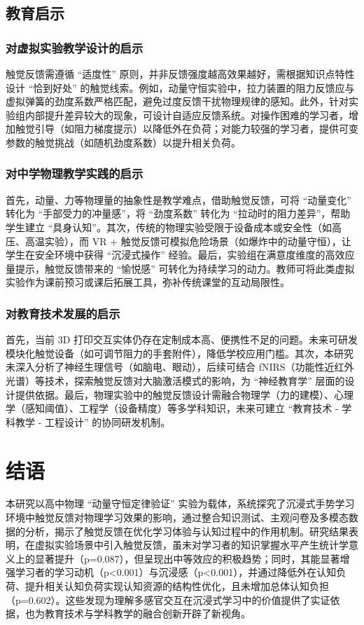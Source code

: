 \documentclass[runningheads]{llncs}
\begin{document}
\subsection{教育启示}
\subsubsection{对虚拟实验教学设计的启示}
触觉反馈需遵循 “适度性” 原则，并非反馈强度越高效果越好，需根据知识点特性设计 “恰到好处” 的触觉线索。例如，动量守恒实验中，拉力装置的阻力反馈应与虚拟弹簧的劲度系数严格匹配，避免过度反馈干扰物理规律的感知。此外，针对实验组内部提升差异较大的现象，可设计自适应反馈系统。对操作困难的学习者，增加触觉引导（如阻力梯度提示）以降低外在负荷；对能力较强的学习者，提供可变参数的触觉挑战（如随机劲度系数）以提升相关负荷。

\subsubsection{对中学物理教学实践的启示}
首先，动量、力等物理量的抽象性是教学难点，借助触觉反馈，可将 “动量变化” 转化为 “手部受力的冲量感”，将 “劲度系数” 转化为 “拉动时的阻力差异”，帮助学生建立 “具身认知”。其次，传统的物理实验受限于设备成本或安全性（如高压、高温实验），而 VR + 触觉反馈可模拟危险场景（如爆炸中的动量守恒），让学生在安全环境中获得 “沉浸式操作” 经验。最后，实验组在满意度维度的高效应量提示，触觉反馈带来的 “愉悦感” 可转化为持续学习的动力。教师可将此类虚拟实验作为课前预习或课后拓展工具，弥补传统课堂的互动局限性。

\subsubsection{对教育技术发展的启示}
首先，当前 3D 打印交互实体仍存在定制成本高、便携性不足的问题。未来可研发模块化触觉设备（如可调节阻力的手套附件），降低学校应用门槛。其次，本研究未深入分析了神经生理信号（如脑电、眼动），后续可结合 fNIRS（功能性近红外光谱）等技术，探索触觉反馈对大脑激活模式的影响，为 “神经教育学” 层面的设计提供依据。最后，物理实验中的触觉反馈设计需融合物理学（力的建模）、心理学（感知阈值）、工程学（设备精度）等多学科知识，未来可建立 “教育技术 - 学科教学 - 工程设计” 的协同研发机制。

\section{结语}
本研究以高中物理 “动量守恒定律验证” 实验为载体，系统探究了沉浸式手势学习环境中触觉反馈对物理学习效果的影响，通过整合知识测试、主观问卷及多模态数据的分析，揭示了触觉反馈在优化学习体验与认知过程中的作用机制。研究结果表明，在虚拟实验场景中引入触觉反馈，虽未对学习者的知识掌握水平产生统计学意义上的显著提升（p=0.087），但呈现出中等效应的积极趋势；同时，其能显著增强学习者的学习动机（p<0.001）与沉浸感（p<0.001），并通过降低外在认知负荷、提升相关认知负荷实现认知资源的结构性优化，且未增加总体认知负担（p=0.602）。这些发现为理解多感官交互在沉浸式学习中的价值提供了实证依据，也为教育技术与学科教学的融合创新开辟了新视角。
\end{document}
